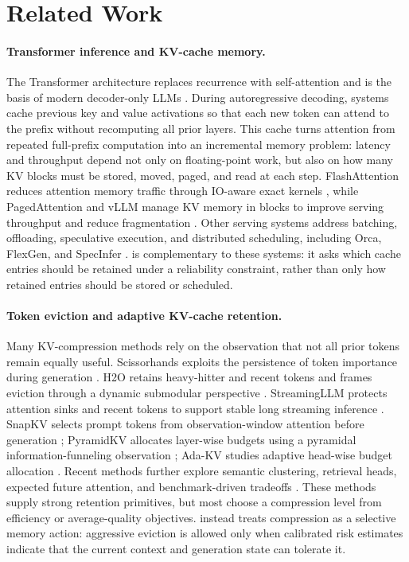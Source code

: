\section{Related Work}

\paragraph{Transformer inference and KV-cache memory.}
The Transformer architecture replaces recurrence with self-attention and is the basis of modern decoder-only LLMs \citep{vaswani2017attention}. During autoregressive decoding, systems cache previous key and value activations so that each new token can attend to the prefix without recomputing all prior layers. This cache turns attention from repeated full-prefix computation into an incremental memory problem: latency and throughput depend not only on floating-point work, but also on how many KV blocks must be stored, moved, paged, and read at each step. FlashAttention reduces attention memory traffic through IO-aware exact kernels \citep{dao2022flashattention}, while PagedAttention and vLLM manage KV memory in blocks to improve serving throughput and reduce fragmentation \citep{kwon2023efficient}. Other serving systems address batching, offloading, speculative execution, and distributed scheduling, including Orca, FlexGen, and SpecInfer \citep{yu2022orca,sheng2023flexgen,miao2023specinfer}. \uckv{} is complementary to these systems: it asks which cache entries should be retained under a reliability constraint, rather than only how retained entries should be stored or scheduled.

\paragraph{Token eviction and adaptive KV-cache retention.}
Many KV-compression methods rely on the observation that not all prior tokens remain equally useful. Scissorhands exploits the persistence of token importance during generation \citep{liu2023scissorhands}. H2O retains heavy-hitter and recent tokens and frames eviction through a dynamic submodular perspective \citep{zhang2023h2o}. StreamingLLM protects attention sinks and recent tokens to support stable long streaming inference \citep{xiao2024streamingllm}. SnapKV selects prompt tokens from observation-window attention before generation \citep{li2024snapkv}; PyramidKV allocates layer-wise budgets using a pyramidal information-funneling observation \citep{cai2024pyramidkv}; Ada-KV studies adaptive head-wise budget allocation \citep{feng2024adakv}. Recent methods further explore semantic clustering, retrieval heads, expected future attention, and benchmark-driven tradeoffs \citep{devoto2025expected,yuan2024kvbenchmark}. These methods supply strong retention primitives, but most choose a compression level from efficiency or average-quality objectives. \uckv{} instead treats compression as a selective memory action: aggressive eviction is allowed only when calibrated risk estimates indicate that the current context and generation state can tolerate it.

